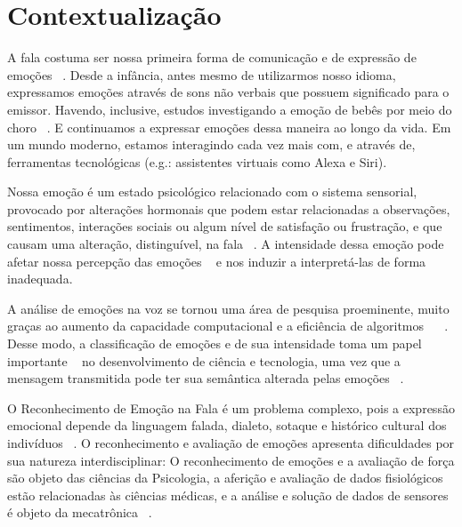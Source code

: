 
\section{Contextualização}

A fala costuma ser nossa primeira forma de comunicação e de expressão de emoções ~\cite{1.5}. Desde a infância, antes mesmo de utilizarmos nosso idioma, expressamos emoções através de sons não verbais que possuem significado para o emissor. Havendo, inclusive, estudos investigando a emoção de bebês por meio do choro ~\cite{0}. E continuamos a expressar emoções dessa maneira ao longo da vida. Em um mundo moderno, estamos interagindo cada vez mais com, e através de, ferramentas tecnológicas (e.g.: assistentes virtuais como Alexa e Siri).

Nossa emoção é um estado psicológico relacionado com o sistema sensorial, provocado por alterações hormonais que podem estar relacionadas a observações, sentimentos, interações sociais ou algum nível de satisfação ou frustração, e que causam uma alteração, distinguível, na fala ~\cite{8}. A intensidade dessa emoção pode afetar nossa percepção das emoções ~\cite{18.46} e nos induzir a interpretá-las de forma inadequada.

A análise de emoções na voz se tornou uma área de pesquisa proeminente, muito graças ao aumento da capacidade computacional e a eficiência de algoritmos ~\cite{38} ~\cite{20}. Desse modo, a classificação de emoções e de sua intensidade toma um papel importante ~\cite{3} no desenvolvimento de ciência e tecnologia, uma vez que a mensagem transmitida pode ter sua semântica alterada pelas emoções ~\cite{39}.

O Reconhecimento de Emoção na Fala é um problema complexo, pois a expressão emocional depende da linguagem falada, dialeto, sotaque e histórico cultural dos indivíduos ~\cite{6}. O reconhecimento e avaliação de emoções apresenta dificuldades por sua natureza interdisciplinar: O reconhecimento de emoções e a avaliação de força são objeto das ciências da Psicologia, a aferição e avaliação de dados fisiológicos estão relacionadas às ciências médicas, e a análise e solução de dados de sensores é objeto da mecatrônica ~\cite{17}.

